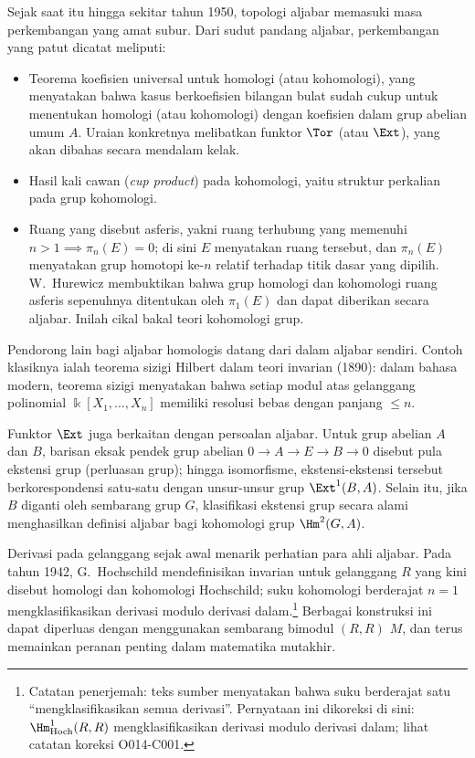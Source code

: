 Sejak saat itu hingga sekitar tahun 1950, topologi aljabar memasuki masa
perkembangan yang amat subur. Dari sudut pandang aljabar, perkembangan
yang patut dicatat meliputi:
\begin{itemize}
	\item Teorema koefisien universal untuk homologi (atau kohomologi),
	yang menyatakan bahwa kasus berkoefisien bilangan bulat sudah cukup
	untuk menentukan homologi (atau kohomologi) dengan koefisien dalam grup
	abelian umum $A$. Uraian konkretnya melibatkan funktor $\Tor$ (atau
	$\Ext$), yang akan dibahas secara mendalam kelak.
	\item Hasil kali cawan (\emph{cup product}) pada kohomologi, yaitu
	struktur perkalian pada grup kohomologi.
	\item Ruang yang disebut asferis, yakni ruang terhubung yang memenuhi
	$n > 1 \implies \pi_n(E) = 0$; di sini $E$ menyatakan ruang tersebut,
	dan $\pi_n(E)$ menyatakan grup homotopi ke-$n$ relatif terhadap titik
	dasar yang dipilih.
	W.\ Hurewicz membuktikan bahwa grup homologi dan kohomologi ruang
	asferis sepenuhnya ditentukan oleh $\pi_1(E)$ dan dapat diberikan secara
	aljabar. Inilah cikal bakal teori kohomologi grup.
\end{itemize}

Pendorong lain bagi aljabar homologis datang dari dalam aljabar sendiri.
Contoh klasiknya ialah teorema sizigi Hilbert dalam teori invarian (1890):
dalam bahasa modern, teorema sizigi menyatakan bahwa setiap modul atas
gelanggang polinomial $\Bbbk[X_1, \ldots, X_n]$ memiliki resolusi bebas
dengan panjang $\leq n$.

Funktor $\Ext$ juga berkaitan dengan persoalan aljabar. Untuk grup abelian
$A$ dan $B$, barisan eksak pendek grup abelian
$0 \to A \to E \to B \to 0$ disebut pula ekstensi grup (perluasan grup);
hingga isomorfisme, ekstensi-ekstensi tersebut berkorespondensi satu-satu
dengan unsur-unsur grup $\Ext^1(B, A)$. Selain itu, jika $B$ diganti oleh
sembarang grup $G$, klasifikasi ekstensi grup secara alami menghasilkan
definisi aljabar bagi kohomologi grup $\Hm^2(G, A)$.

Derivasi pada gelanggang sejak awal menarik perhatian para ahli aljabar.
Pada tahun 1942, G.\ Hochschild
mendefinisikan invarian untuk gelanggang $R$ yang kini disebut homologi
dan kohomologi Hochschild; suku kohomologi berderajat $n=1$
mengklasifikasikan derivasi modulo derivasi dalam.\footnote{Catatan
penerjemah: teks sumber menyatakan bahwa suku berderajat satu
``mengklasifikasikan semua derivasi''. Pernyataan ini dikoreksi di sini:
$\Hm^1_{\mathrm{Hoch}}(R,R)$ mengklasifikasikan derivasi modulo derivasi
dalam; lihat catatan koreksi O014-C001.}
Berbagai konstruksi ini dapat diperluas dengan menggunakan sembarang
bimodul $(R, R)$ $M$, dan terus memainkan peranan penting dalam matematika
mutakhir.


